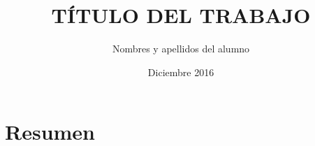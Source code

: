 \documentclass[a4paper, 12pt, oneside]{tesisutec}
\begin{document}
\frontmatter
{}
\title {TÍTULO DEL TRABAJO}
\author{Nombres y apellidos del alumno}
\date{Diciembre 2016}

\maketitle
{}





\tableofcontents
\newpage
\listoftables
\newpage
\listoffigures


\mainmatter
\pagestyle{fancy}

\chapter*{Resumen}
%







% 

\renewcommand{\bibname}{\large\bf{REFERENCIAS BIBLIOGR\'AFICAS}}
\end{document}
